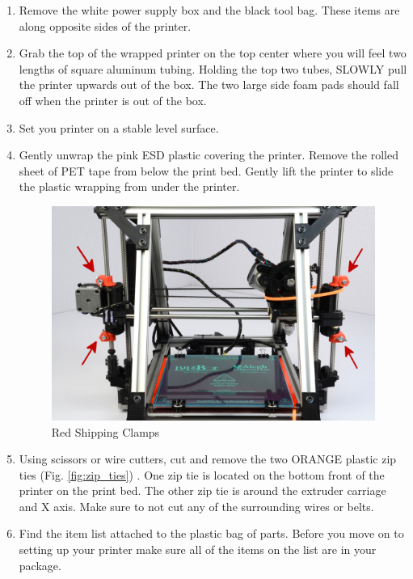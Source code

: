 \documentclass[twoside,12pt,openright,final,english]{memoir}
\begin{document}
\begin{enumerate}
\item Remove the white power supply box and the black tool bag. These items are along opposite sides of the printer.

\item Grab the top of the wrapped printer on the top center where you will feel two lengths of square aluminum tubing. Holding the top two tubes, SLOWLY pull the printer upwards out of the box. The two large side foam pads should fall off when the printer is out of the box.

\item Set you printer on a stable level surface.

\item Gently unwrap the pink ESD plastic covering the printer. Remove the rolled sheet of PET tape from below the print bed. Gently lift the printer to slide the plastic wrapping from under the printer. 

\begin{figure}[h]
\centering
\includegraphics[keepaspectratio=true,angle=0,height=0.3\textheight,width=1.0\textwidth]{shipping_clamps.jpg}
\caption{Red Shipping Clamps}
\label{fig:shipping_clamps}
\end{figure}

\item Using scissors or wire cutters, cut and remove the two ORANGE plastic zip ties
(Fig. \ref{fig:zip_ties})
. One zip tie is located on the bottom front of the printer on the print bed. The other zip tie is around the extruder carriage and X axis. Make sure to not cut any of the surrounding wires or belts.

\item Find the item list attached to the plastic bag of parts. Before you move on to setting up your printer make sure all of the items on the list are in your package.


\end{enumerate}
\end{document}
